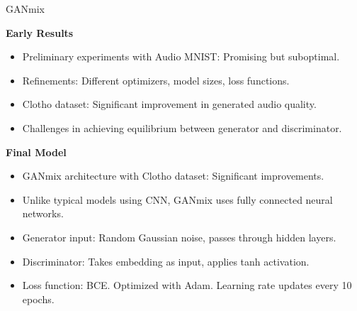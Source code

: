 \begin{frame}{GANmix}
{        \textbf{Early Results}
        \begin{itemize}
            \item Preliminary experiments with Audio MNIST: Promising but suboptimal.
            \item Refinements: Different optimizers, model sizes, loss functions.
            \item Clotho dataset: Significant improvement in generated audio quality.
            \item Challenges in achieving equilibrium between generator and discriminator.
        \end{itemize}

        \textbf{Final Model}
        \begin{itemize}
            \item GANmix architecture with Clotho dataset: Significant improvements.
            \item Unlike typical models using CNN, GANmix uses fully connected neural networks.
            \item Generator input: Random Gaussian noise, passes through hidden layers.
            \item Discriminator: Takes embedding as input, applies tanh activation.
            \item Loss function: BCE. Optimized with Adam. Learning rate updates every 10 epochs.
        \end{itemize}
    }
\end{frame}
